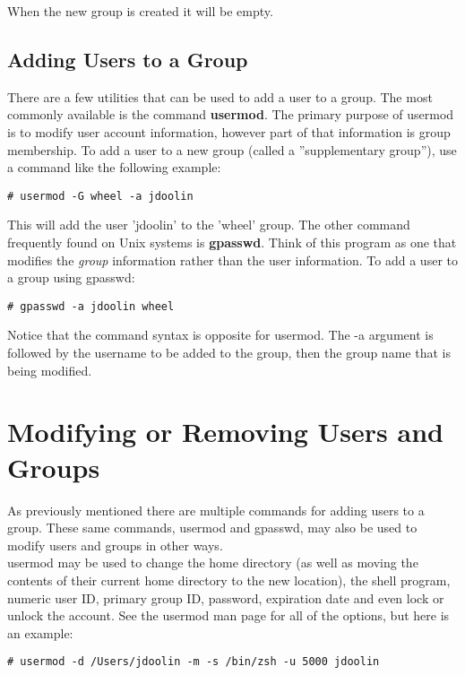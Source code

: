 When the new group is created it will be empty.

\subsection{Adding Users to a Group}

There are a few utilities that can be used to add a user to a group.  The most commonly available is the command \textbf{usermod}.  The primary purpose of usermod is to modify user account information, however part of that information is group membership.  To add a user to a new group (called a ''supplementary group''), use a command like the following example:

\begin{verbatim}
# usermod -G wheel -a jdoolin
\end{verbatim}

This will add the user 'jdoolin' to the 'wheel' group.  The other command frequently found on Unix systems is \textbf{gpasswd}.  Think of this program as one that modifies the \textit{group} information rather than the user information.  To add a user to a group using gpasswd:

\begin{verbatim}
# gpasswd -a jdoolin wheel
\end{verbatim}

Notice that the command syntax is opposite for usermod.  The -a argument is followed by the username to be added to the group, then the group name that is being modified.

\section{Modifying or Removing Users and Groups}

As previously mentioned there are multiple commands for adding users to a group.  These same commands, usermod and gpasswd, may also be used to modify users and groups in other ways.\\

usermod may be used to change the home directory (as well as moving the contents of their current home directory to the new location), the shell program, numeric user ID, primary group ID, password, expiration date and even lock or unlock the account.  See the usermod man page for all of the options, but here is an example:

\begin{verbatim}
# usermod -d /Users/jdoolin -m -s /bin/zsh -u 5000 jdoolin
\end{verbatim}


